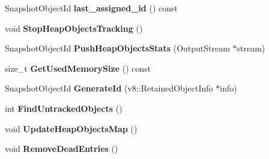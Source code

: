 \begin{DoxyCompactItemize}
\item 
\hypertarget{classv8_1_1internal_1_1_heap_objects_map_a173be928aaaa43dcdb94f97d39bb8a5a}{}Snapshot\+Object\+Id {\bfseries last\+\_\+assigned\+\_\+id} () const \label{classv8_1_1internal_1_1_heap_objects_map_a173be928aaaa43dcdb94f97d39bb8a5a}

\item 
\hypertarget{classv8_1_1internal_1_1_heap_objects_map_a73ec46f75f7c486e3fcec5643766c442}{}void {\bfseries Stop\+Heap\+Objects\+Tracking} ()\label{classv8_1_1internal_1_1_heap_objects_map_a73ec46f75f7c486e3fcec5643766c442}

\item 
\hypertarget{classv8_1_1internal_1_1_heap_objects_map_aefbc855927277af8f2b6924ded37890e}{}Snapshot\+Object\+Id {\bfseries Push\+Heap\+Objects\+Stats} (Output\+Stream $\ast$stream)\label{classv8_1_1internal_1_1_heap_objects_map_aefbc855927277af8f2b6924ded37890e}

\item 
\hypertarget{classv8_1_1internal_1_1_heap_objects_map_ac0ecf41525d2e97dd56303ece9f54edf}{}size\+\_\+t {\bfseries Get\+Used\+Memory\+Size} () const \label{classv8_1_1internal_1_1_heap_objects_map_ac0ecf41525d2e97dd56303ece9f54edf}

\item 
\hypertarget{classv8_1_1internal_1_1_heap_objects_map_a246be15ede06e7dd8211be57c67b140c}{}Snapshot\+Object\+Id {\bfseries Generate\+Id} (v8\+::\+Retained\+Object\+Info $\ast$info)\label{classv8_1_1internal_1_1_heap_objects_map_a246be15ede06e7dd8211be57c67b140c}

\item 
\hypertarget{classv8_1_1internal_1_1_heap_objects_map_a53220f38cefe35e6b7acf5da451ee2ff}{}int {\bfseries Find\+Untracked\+Objects} ()\label{classv8_1_1internal_1_1_heap_objects_map_a53220f38cefe35e6b7acf5da451ee2ff}

\item 
\hypertarget{classv8_1_1internal_1_1_heap_objects_map_af0743759fc64433e0a2b207168dfb566}{}void {\bfseries Update\+Heap\+Objects\+Map} ()\label{classv8_1_1internal_1_1_heap_objects_map_af0743759fc64433e0a2b207168dfb566}

\item 
\hypertarget{classv8_1_1internal_1_1_heap_objects_map_a11421eef0d71d30bee53d0112e19efeb}{}void {\bfseries Remove\+Dead\+Entries} ()\label{classv8_1_1internal_1_1_heap_objects_map_a11421eef0d71d30bee53d0112e19efeb}

\end{DoxyCompactItemize}
